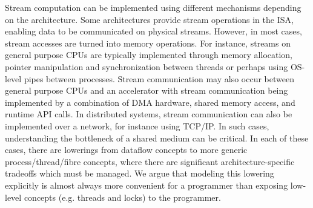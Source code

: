 \documentclass{tufte-handout}
\begin{document}
Stream computation can be implemented using different mechanisms depending on the architecture. Some architectures provide stream operations in the ISA, enabling data to be communicated on physical streams. However, in most cases, stream accesses are turned into memory operations.  For instance, streams on general purpose CPUs are typically implemented through memory allocation, pointer manipulation and synchronization between threads or perhaps using OS-level pipes between processes.  Stream communication may also occur between general purpose CPUs and an accelerator with stream communication being implemented by a combination of DMA hardware, shared memory access, and runtime API calls.  In distributed systems, stream communication can also be implemented over a network, for instance using TCP/IP.  In such cases, understanding the bottleneck of a shared medium can be critical.  In each of these cases, there are lowerings from dataflow concepts to more generic process/thread/fibre concepts, where there are significant architecture-specific tradeoffs which must be managed.  We argue that modeling this lowering explicitly is almost always more convenient for a programmer than exposing low-level concepts (e.g. threads and locks) to the programmer.



\subsection{}



\end{document}
